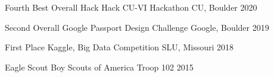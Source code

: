 



\begin{cvhonors}

  \cvhonor
    {Fourth Best Overall Hack} %
    {Hack CU-VI Hackathon} %
    {CU, Boulder} %
    {2020} %

  \cvhonor
    {Second Overall} %
    {Google Passport  Design Challenge} %
    {Google, Boulder} %
    {2019} %

  \cvhonor
    {First Place} %
    {Kaggle, Big Data Competition} %
    {SLU, Missouri} %
    {2018} %

  \cvhonor
    {Eagle Scout} %
    {Boy Scouts of America} %
    {Troop 102} %
    {2015} %

\end{cvhonors}
